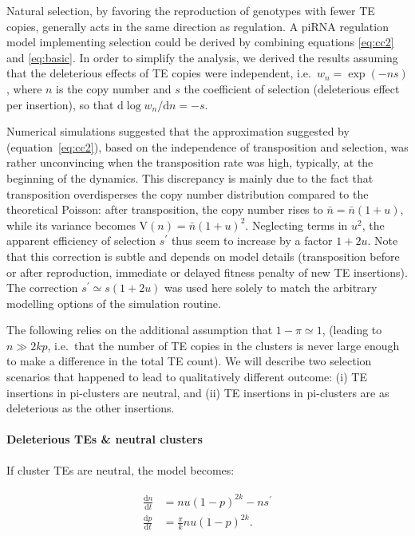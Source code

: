 \documentclass[10pt,a4paper]{article}
\begin{document}
Natural selection, by favoring the reproduction of genotypes with fewer TE copies, generally acts in the same direction as regulation. A piRNA regulation model implementing selection could be derived by combining equations \ref{eq:cc2} and \ref{eq:basic}. In order to simplify the analysis, we derived the results assuming that the deleterious effects of TE copies were independent, i.e.\ $w_n = \exp(- n s)$, where $n$ is the copy number and $s$ the coefficient of selection (deleterious effect per insertion), so that $\mathrm{d} \log w_n / \mathrm{d} n = -s$. 

Numerical simulations suggested that the approximation suggested by \citep{CC83} (equation~\ref{eq:cc2}), based on the independence of transposition and selection, was rather unconvincing when the transposition rate was high, typically, at the beginning of the dynamics. This discrepancy is mainly due to the fact that transposition overdisperses the copy number distribution compared to the theoretical Poisson: after transposition, the copy number rises to $\bar n = \bar n(1+u)$, while its variance becomes $\mathrm V(n) = \bar n (1+u)^2$. Neglecting terms in $u^2$, the apparent efficiency of selection $s^\prime$ thus seem to increase by a factor $1+2u$. Note that this correction is subtle and depends on model details (transposition before or after reproduction, immediate or delayed fitness penalty of new TE insertions). The correction $s^\prime \simeq s(1+2u)$ was used here solely to match the arbitrary modelling options of the simulation routine. 

The following relies on the additional assumption that $1-\pi \simeq 1$, (leading to $n \gg 2kp$, i.e.\ that the number of TE copies in the clusters is never large enough to make a difference in the total TE count). We will describe two selection scenarios that happened to lead to qualitatively different outcome: (i) TE insertions in pi-clusters are neutral, and (ii) TE insertions in pi-clusters are as deleterious as the other insertions. 

\paragraph{Deleterious TEs \& neutral clusters} If cluster TEs are neutral, the model becomes:

\begin{align}\label{eq:dtnc}
\begin{split}
\frac{\mathrm d n}{\mathrm d t} &= n u (1-p)^{2k} - n s^\prime \\
\frac{\mathrm d p}{\mathrm d t} &= \frac{\pi}{k} n u (1-p)^{2k}.
\end{split}
\end{align}
\end{document}
